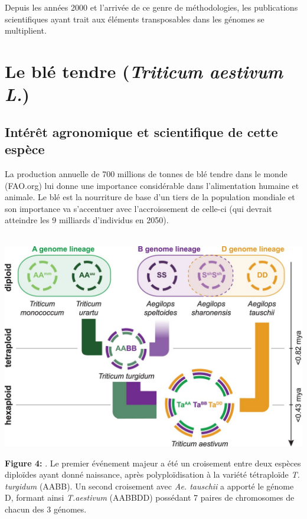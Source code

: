\documentclass[a4paper, 12pt]{article}
\begin{document}
\begin{onehalfspace}
Depuis les années 2000 et l'arrivée de ce genre de méthodologies, les publications scientifiques ayant trait aux éléments transposables dans les génomes se multiplient. 

\section{Le blé tendre (\textit{Triticum aestivum L.})}
\subsection{Intérêt agronomique et scientifique de cette espèce}
La production annuelle de 700 millions de tonnes de blé tendre dans le monde (FAO.org) lui donne une importance considérable dans l'alimentation humaine et animale. Le blé est la nourriture de base d'un tiers de la population mondiale et son importance va s'accentuer avec l'accroissement de celle-ci (qui devrait atteindre les 9 milliards d'individus en 2050).

\newpage
\thispagestyle{empty}
\begin{center}
~ \vfill
\includegraphics[scale=1.1]{pic_Data/fig5.jpg}\\
\end{center}
\textbf{Figure 4:} . Le premier événement majeur a été un croisement entre deux espèces diploïdes ayant donné naissance, après polyploïdisation à la variété tétraploïde \textit{T. turgidum} (AABB). Un second croisement avec \textit{Ae. tauschii} a apporté le génome D, formant ainsi \textit{T.aestivum} (AABBDD) possédant 7 paires de chromosomes de chacun des 3 génomes.


\end{onehalfspace}
\end{document}
